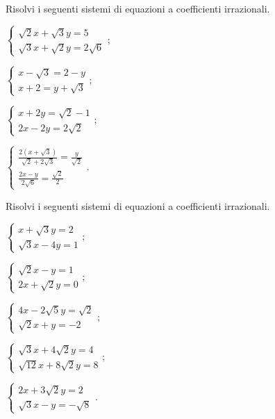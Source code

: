 \begin{esercizio}[\Ast]
 \label{ese:2.85}
Risolvi i seguenti sistemi di equazioni a coefficienti irrazionali.
 \begin{multicols}{2}
 \begin{enumeratea}
 \item $\left\{\begin{array}{l}{\sqrt 2x+\sqrt 3y=5}\\
 {\sqrt 3x+\sqrt 2y=2\sqrt 6} \end{array}\right.;$
 \item $\left\{\begin{array}{l}{x-\sqrt 3=2-y}\\
 {x+2=y+\sqrt 3} \end{array}\right.;$
 \item $\left\{\begin{array}{l}{x+2y=\sqrt 2-1}\\
 {2x-2y=2\sqrt 2} \end{array}\right.;$
 \item $\left\{\begin{array}{l}{\frac{2\left(x+\sqrt 3\right)}{\sqrt 2+2\sqrt 3}=\frac y{\sqrt 2}}\\
 {\frac{2x-y}{2\sqrt 6}=\frac{\sqrt 2} 2} \end{array}\right..$
 \end{enumeratea}
 \end{multicols}
\end{esercizio}
\newpage
\begin{esercizio}[\Ast]
 \label{ese:2.86}
Risolvi i seguenti sistemi di equazioni a coefficienti irrazionali.
 \begin{multicols}{2}
 \begin{enumeratea}
 \item $\left\{\begin{array}{l}x+\sqrt 3y=2\\
 \sqrt 3x-4y=1 \end{array}\right.;$
 \item $\left\{\begin{array}{l}\sqrt 2x-y=1\\
 2x+\sqrt 2y=0 \end{array}\right.;$
 \item $\left\{\begin{array}{l}4x-2\sqrt 5y=\sqrt 2\\
 \sqrt 2x+y=-2 \end{array}\right.;$
 \item $\left\{\begin{array}{l}\sqrt 3x+4\sqrt 2y=4\\
 \sqrt{12}x+8\sqrt 2y=8 \end{array}\right.;$
 \item $\left\{\begin{array}{l}2x+3\sqrt 2y=2\\
 \sqrt 3x-y=-\sqrt 8 \end{array}\right..$
 \end{enumeratea}
 \end{multicols}
\end{esercizio}

